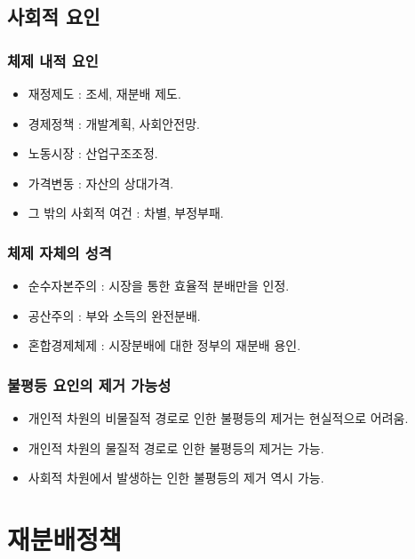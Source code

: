 \documentclass[aspectratio=169,xcolor=dvipsnames,handout]{beamer}
\begin{document}
\subsection{사회적 요인}

\begin{frame}[<+->]
\frametitle{체제 내적 요인}
    \begin{itemize}
        \item 재정제도 : 조세, 재분배 제도.
        \item 경제정책 : 개발계획, 사회안전망.
        \item 노동시장 : 산업구조조정.
        \item 가격변동 : 자산의 상대가격.
        \item 그 밖의 사회적 여건 : 차별, 부정부패.
    \end{itemize}
\end{frame}

\begin{frame}[<+->]
\frametitle{체제 자체의 성격}
    \begin{itemize}
        \item 순수자본주의 : 시장을 통한 효율적 분배만을 인정.
        \item 공산주의 : 부와 소득의 완전분배.
        \item 혼합경제체제 : 시장분배에 대한 정부의 재분배 용인.
    \end{itemize}
\end{frame}

\begin{frame}[<+->]
\frametitle{불평등 요인의 제거 가능성}
    \begin{itemize}
        \item 개인적 차원의 비물질적 경로로 인한 불평등의 제거는 현실적으로 어려움.
        \item 개인적 차원의 물질적 경로로 인한 불평등의 제거는 가능.
        \item 사회적 차원에서 발생하는 인한 불평등의 제거 역시 가능.
    \end{itemize}
\end{frame}

\section{재분배정책}
\end{document}
